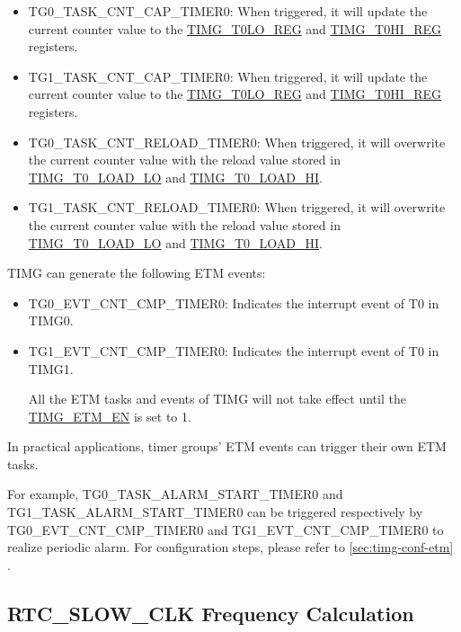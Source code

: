 \documentclass[main\_\_EN.tex]{subfiles}
\begin{document}
\begin{itemize}
\item TG0\_TASK\_CNT\_CAP\_TIMER0: When triggered, it will update the current counter value to the \hyperref[regdesc:TIMGTXLOREG]{TIMG\_T0LO\_REG} and \hyperref[regdesc:TIMGTXHIREG]{TIMG\_T0HI\_REG} registers.
\item TG1\_TASK\_CNT\_CAP\_TIMER0: When triggered, it will update the current counter value to the \hyperref[regdesc:TIMGTXLOREG]{TIMG\_T0LO\_REG} and \hyperref[regdesc:TIMGTXHIREG]{TIMG\_T0HI\_REG} registers.
\item TG0\_TASK\_CNT\_RELOAD\_TIMER0: When triggered, it will overwrite the current counter value with the reload value stored in \hyperref[fielddesc:TIMGTXLOADLO]{TIMG\_T0\_LOAD\_LO} and \hyperref[fielddesc:TIMGTXLOADHI]{TIMG\_T0\_LOAD\_HI}.
\item TG1\_TASK\_CNT\_RELOAD\_TIMER0: When triggered, it will overwrite the current counter value with the reload value stored in \hyperref[fielddesc:TIMGTXLOADLO]{TIMG\_T0\_LOAD\_LO} and \hyperref[fielddesc:TIMGTXLOADHI]{TIMG\_T0\_LOAD\_HI}.
\end{itemize}

TIMG can generate the following ETM events:

\begin{itemize}
    \item TG0\_EVT\_CNT\_CMP\_TIMER0: Indicates the interrupt event of T0 in TIMG0.
    \item TG1\_EVT\_CNT\_CMP\_TIMER0: Indicates the interrupt event of T0 in TIMG1.

\begin{tiplisting}
All the ETM tasks and events of TIMG will not take effect until the \hyperref[fielddesc:TIMGETMEN]{TIMG\_ETM\_EN} is set to 1.
\end{tiplisting}
\end{itemize}

In practical applications, timer groups' ETM events can trigger their own ETM tasks.

For example, TG0\_TASK\_ALARM\_START\_TIMER0 and TG1\_TASK\_ALARM\_START\_TIMER0 can be triggered respectively by TG0\_EVT\_CNT\_CMP\_TIMER0 and TG1\_EVT\_CNT\_CMP\_TIMER0 to realize periodic alarm. For configuration steps, please refer to \ref{sec:timg-conf-etm} .


\subsection{RTC\_SLOW\_CLK Frequency Calculation}\label{sec:rtc-calibration-desc}
\end{document}
